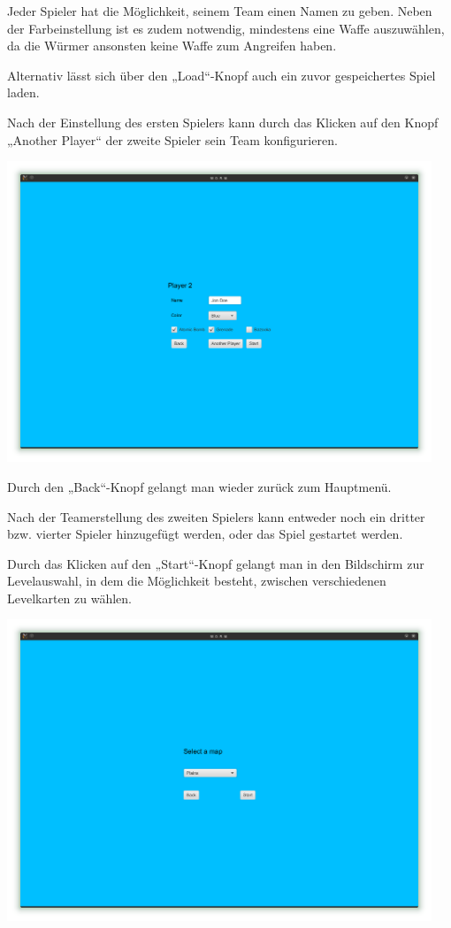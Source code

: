 \documentclass{scrreprt}
\begin{document}
Jeder Spieler hat die Möglichkeit, seinem Team einen Namen zu geben.
Neben der Farbeinstellung ist es zudem notwendig, mindestens eine Waffe auszuwählen, da die Würmer ansonsten keine Waffe zum Angreifen haben.

Alternativ lässt sich über den „Load“-Knopf auch ein zuvor gespeichertes Spiel laden.

Nach der Einstellung des ersten Spielers kann durch das Klicken auf den Knopf „Another Player“ der zweite Spieler sein Team konfigurieren.

\includegraphics[height=9cm]{Screenshot6.png}

Durch den „Back“-Knopf gelangt man wieder zurück zum Hauptmenü.

Nach der Teamerstellung des zweiten Spielers kann entweder noch ein dritter bzw. vierter Spieler
hinzugefügt werden, oder das Spiel gestartet werden.

Durch das Klicken auf den „Start“-Knopf gelangt man in den Bildschirm zur Levelauswahl, in dem die Mög\-lichkeit
besteht, zwischen verschiedenen Levelkarten zu wählen.

\includegraphics[height=9cm]{Screenshot7.png}
\end{document}
